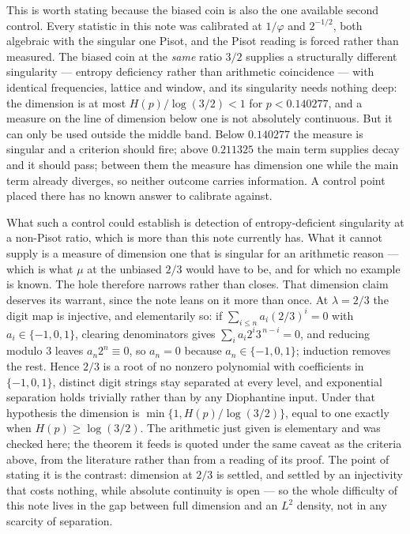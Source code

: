 \documentclass[11pt]{article}
\theoremstyle{remark}
\newcommand{\lam}{\lambda}
\begin{document}
This is worth stating because the biased coin is also the one available second control. Every statistic in
this note was calibrated at $1/\varphi$ and $2^{-1/2}$, both algebraic with the singular one Pisot, and
the Pisot reading is forced rather than measured. The biased coin at the \emph{same} ratio $3/2$ supplies
a structurally different singularity --- entropy deficiency rather than arithmetic coincidence --- with
identical frequencies, lattice and window, and its singularity needs nothing deep: the dimension is at
most $H(p)/\log(3/2)<1$ for $p<0.140277$, and a measure on the line of dimension below one is not
absolutely continuous. But it can only be used outside the middle band. Below $0.140277$ the measure is
singular and a criterion should fire; above $0.211325$ the main term supplies decay and it should pass;
between them the measure has dimension one while the main term already diverges, so neither outcome
carries information. A control point placed there has no known answer to calibrate against.

What such a control could establish is detection of entropy-deficient singularity at a non-Pisot ratio,
which is more than this note currently has. What it cannot supply is a measure of dimension one that is
singular for an arithmetic reason --- which is what $\mu$ at the unbiased $2/3$ would have to be, and for
which no example is known. The hole therefore narrows rather than closes.
 That dimension claim deserves its warrant, since the note leans on it more than once. At
$\lam=2/3$ the digit map is injective, and elementarily so: if $\sum_{i\le n}a_i(2/3)^i=0$ with
$a_i\in\{-1,0,1\}$, clearing denominators gives $\sum_ia_i2^i3^{\,n-i}=0$, and reducing modulo $3$ leaves
$a_n2^n\equiv0$, so $a_n=0$ because $a_n\in\{-1,0,1\}$; induction removes the rest. Hence $2/3$ is a root
of no nonzero polynomial with coefficients in $\{-1,0,1\}$, distinct digit strings stay separated at
every level, and exponential separation holds trivially rather than by any Diophantine input. Under that
hypothesis the dimension is $\min\{1,H(p)/\log(3/2)\}$, equal to one exactly when $H(p)\ge\log(3/2)$.
The arithmetic just given is elementary and was checked here; the theorem it feeds is quoted under the
same caveat as the criteria above, from the literature rather than from a reading of its proof. The
point of stating it is the contrast: dimension at $2/3$ is settled, and settled by an injectivity that
costs nothing, while absolute continuity is open --- so the whole difficulty of this note lives in the
gap between full dimension and an $L^2$ density, not in any scarcity of separation.
\end{document}
